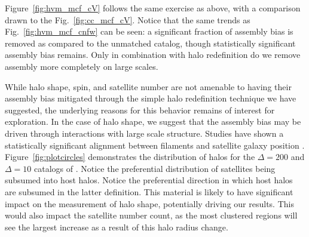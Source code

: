 \documentclass[usenatbib]{mnras}
\begin{document}
Figure~\ref{fig:hvm_mcf_cV} follows the same exercise as above, with a comparison drawn to the Fig.~\ref{fig:cc_mcf_cV}. Notice that the same trends as Fig.~\ref{fig:hvm_mcf_cnfw} can be seen: a significant fraction of assembly bias is removed as compared to the unmatched catalog, though statistically significant assembly bias remains. Only in combination with halo redefinition do we remove assembly more completely on large scales.




While halo shape, spin, and satellite number are not amenable to having their assembly bias mitigated through the
simple halo redefinition technique we have suggested, the underlying reasons for this behavior remains of
interest for exploration. In the case of halo shape, we suggest that the assembly bias may be driven through
interactions with large scale structure. Studies have shown a statistically significant alignment between
filaments and satellite galaxy position \citep{tempel_etal15, velliscig_etal15}. Figure~\ref{fig:plotcircles} demonstrates the distribution of halos for the $\Delta=200$
and $\Delta=10$ catalogs of \simB. 
Notice the preferential distribution of satellites being subsumed into host halos.  Notice the preferential
direction in which host halos are subsumed in the latter definition. This material is likely to have significant
impact on the measurement of halo shape, potentially driving our results. This would also impact the satellite
number count, as the most clustered regions will see the largest increase as a result of this halo radius change.
\end{document}
